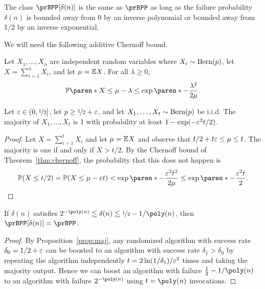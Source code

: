 The class $\prBPP[\delta(n)]$ is the same as $\prBPP$ as long as the failure probability $\delta(n)$ is bounded away from 0 by an inverse polynomial or bounded away from 1/2 by an inverse exponential.

We will need the following additive Chernoff bound.

\begin{theorem}\label{thm:chernoff}
  Let $X_1, \dots, X_n$ are independent random variables where $X_i \sim
  \operatorname{Bern}(p)$, let $X = \sum_{i=1}^n X_i$, and let $\mu = \mathbb{E} X$. For all
  $\lambda \ge 0$, \[
    \Pr\paren*{X \le \mu - \lambda} \le \exp\paren*{-\frac{\lambda^2}{2\mu}}.
  \]
\end{theorem}

\begin{proposition}\label{prop:maj}
  Let $\varepsilon \in (0, \nicefrac{1}{2}]$, let $p \ge \nicefrac{1}{2} + \varepsilon$, and let $X_1,
  \dots, X_t \sim \operatorname{Bern}(p)$ be i.i.d. The majority of $X_1, \dots, X_t$ is 1
  with probability at least $1 - \exp(-\varepsilon^2 t/2)$.
\end{proposition}

\begin{proof}
  Let $X = \sum_{i=1}^t X_i$ and let $\mu = \mathbb{E} X$ and observe that $t/2 + t\varepsilon \le \mu \le t$. The majority is one if and
  only if $X > t/2$. By the Chernoff bound of Theorem~\ref{thm:chernoff}, the probability that this does
  not happen is \[
    \Pr(X \le t/2) = \Pr(X \le \mu - \eps t) < \exp\paren*{-\frac{\eps^2t^2}{2\mu}} \le \exp\paren*{-\frac{\eps^2t}{2}}. \qedhere
  \]
\end{proof}

\begin{corollary}\label{cor:bpp-small-error}
  If $\delta(n)$ satisfies $2^{-\poly(n)} \lesssim \delta(n) \lesssim \nicefrac{1}{2} - 1/\poly(n)$, then $\prBPP[\delta(n)] = \prBPP$.
\end{corollary}

\begin{proof}
  By Proposition~\ref{prop:maj}, any randomized algorithm with success rate $\delta_0 =
  1/2 + \varepsilon$ can be boosted to an algorithm with success rate $\delta_1 >
  \delta_0$ by repeating the algorithm independently $t =
  2\ln(1 / \delta_1)/\varepsilon^2$ times and taking the majority output. Hence we can boost an algorithm with failure $\frac{1}{2} - 1/\poly(n)$ to an algorithm with failure $2^{-\poly(n)}$ using $t = \poly(n)$ invocations.
\end{proof}

